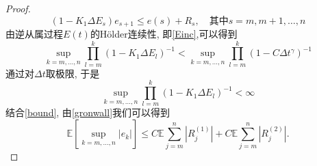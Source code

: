 \begin{proof}
\begin{equation}
		(1-K_1\Delta E_s)e_{s+1}\leq e(s)+R_{s},\quad\text{其中}s=m,m+1, \ldots ,n
	\end{equation}
	由逆从属过程$E(t)$的Hölder连续性, 即\cref{Einc},可以得到 
	\begin{equation}\label{bound}
	\sup\limits_{k=m,\ldots, n}	\prod\limits_{l=m}^{k}(1-K_1\Delta E_l)^{-1} <\sup\limits_{k=m,\ldots, n}	\prod\limits_{l=m}^{k}(1-C\Delta t^{\gamma})^{-1}
	\end{equation}
	通过对$\Delta t$取极限, 于是
	\[
	\sup\limits_{k=m,\ldots, n}	\prod\limits_{l=m}^{k}(1-K_1\Delta E_l)^{-1}<\infty
	\]
	结合\cref{bound}, 由\cref{gronwall}我们可以得到
	$$\mathbb{E}  \left[\sup\limits_{k=m,\ldots, n}|e_k|\right] \leq C\mathbb{E}\sum\limits_{j=m}^{n}\left|R_{j}^{(1)} \right| + C\mathbb{E}\sum\limits_{j=m}^{n}\left|R_{j}^{(2)} \right|.$$
	

\end{proof}

